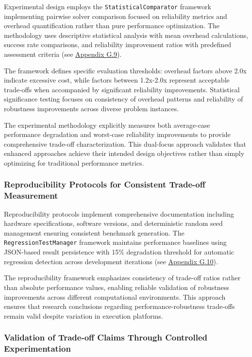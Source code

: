 Experimental design employs the \texttt{StatisticalComparator} framework implementing pairwise solver comparison focused on reliability metrics and overhead quantification rather than pure performance optimization. The methodology uses descriptive statistical analysis with mean overhead calculations, success rate comparisons, and reliability improvement ratios with predefined assessment criteria (see \hyperref[appendix:statistical-analysis]{Appendix G.9}).

The framework defines specific evaluation thresholds: overhead factors above 2.0x indicate excessive cost, while factors between 1.2x-2.0x represent acceptable trade-offs when accompanied by significant reliability improvements. Statistical significance testing focuses on consistency of overhead patterns and reliability of robustness improvements across diverse problem instances.

The experimental methodology explicitly measures both average-case performance degradation and worst-case reliability improvements to provide comprehensive trade-off characterization. This dual-focus approach validates that enhanced approaches achieve their intended design objectives rather than simply optimizing for traditional performance metrics.

\subsubsection{Reproducibility Protocols for Consistent Trade-off Measurement}
\label{sec:reproducibility-protocols}

Reproducibility protocols implement comprehensive documentation including hardware specifications, software versions, and deterministic random seed management ensuring consistent benchmark generation. The \texttt{RegressionTestManager} framework maintains performance baselines using JSON-based result persistence with 15\% degradation threshold for automatic regression detection across development iterations (see \hyperref[appendix:reproducibility]{Appendix G.10}).

The reproducibility framework emphasizes consistency of trade-off ratios rather than absolute performance values, enabling reliable validation of robustness improvements across different computational environments. This approach ensures that research conclusions regarding performance-robustness trade-offs remain valid despite variation in execution platforms.

\subsubsection{Validation of Trade-off Claims Through Controlled Experimentation}
\label{sec:controlled-experimentation}

